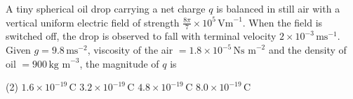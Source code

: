 
\item A tiny spherical oil drop carrying a net charge $q$ is balanced in still air with a vertical uniform electric field of strength $\frac{8\pi}{7} \times 10^5\, \text{Vm}^{-1}$. When the field is switched off, the drop is observed to fall with terminal velocity $2 \times 10^{-3}\, \text{ms}^{-1}$.
Given $g = 9.8\, \text{ms}^{-2}$, viscosity of the air $= 1.8 \times 10^{-5}\, \text{Ns m}^{-2}$ and the density of oil $= 900\, \text{kg m}^{-3}$, the magnitude of $q$ is
\begin{tasks}(2)
    \task $1.6 \times 10^{-19}\, \text{C}$
    \task $3.2 \times 10^{-19}\, \text{C}$
    \task $4.8 \times 10^{-19}\, \text{C}$
    \task $8.0 \times 10^{-19}\, \text{C}$\ans
\end{tasks}
